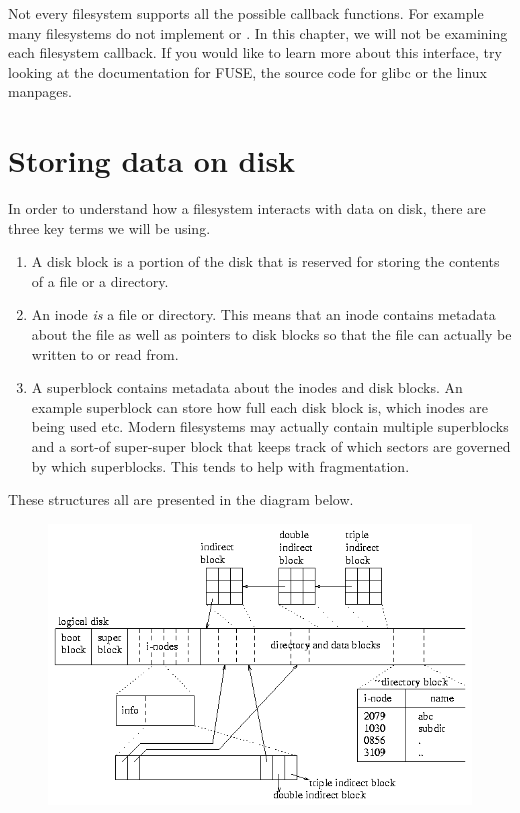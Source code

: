Not every filesystem supports all the possible callback functions. For example many filesystems do not implement  or . In this chapter, we will not be examining each filesystem callback. If you would like to learn more about this interface, try looking at the documentation for FUSE, the source code for glibc or the linux manpages.

\section{Storing data on disk}

In order to understand how a filesystem interacts with data on disk, there are three key terms we will be using.
\begin{enumerate}
  \item {} A disk block is a portion of the disk that is reserved for storing the contents of a file or a directory.
  \item {} An inode \emph{is} a file or directory. This means that an inode contains metadata about the file as well as pointers to disk blocks so that the file can actually be written to or read from.
  \item {} A superblock contains metadata about the inodes and disk blocks. An example superblock can store how full each disk block is, which inodes are being used etc. Modern filesystems may actually contain multiple superblocks and a sort-of super-super block that keeps track of which sectors are governed by which superblocks. This tends to help with fragmentation.
\end{enumerate}

These structures all are presented in the diagram below.

\begin{figure}[htbp]
\centering
\includegraphics[width=.8\textwidth]{filesystems/images/disk.gif}
\caption{}
\end{figure}

